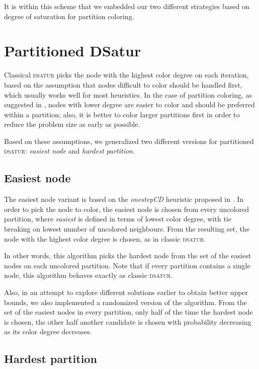 It is within this scheme that we embedded our two different strategies based on degree of saturation for partition coloring.

\section{Partitioned DSatur}
\label{subsec:heur:pdsatur}

Classical \textsc{dsatur} picks the node with the highest color degree on each iteration, based on the assumption that nodes difficult to color should be handled first, which usually works well for most heuristics. In the case of partition coloring, as suggested in \cite{Li00thepartition}, nodes with lower degree are easier to color and should be preferred within a partition; also, it is better to color larger partitions first in order to reduce the problem size as early as possible.

Based on these assumptions, we generalized two different versions for partitioned \textsc{dsatur}: \textit{easiest node} and \textit{hardest partition}.

\subsection{Easiest node}

The easiest node variant is based on the \textit{onestepCD} heuristic proposed in \cite{Li00thepartition}. In order to pick the node to color, the easiest node is chosen from every uncolored partition, where \textit{easiest} is defined in terms of lowest color degree, with tie breaking on lowest number of uncolored neighbours. From the resulting set, the node with the highest color degree is chosen, as in classic \textsc{dsatur}. 

In other words, this algorithm picks the hardest node from the set of the easiest nodes on each uncolored partition. Note that if every partition contains a single node, this algorithm behaves exactly as classic \textsc{dsatur}.

Also, in an attempt to explore different solutions earlier to obtain better upper bounds, we also implemented a randomized version of the algorithm. From the set of the easiest nodes in every partition, only half of the time the hardest node is chosen, the other half another candidate is chosen with probability decreasing as its color degree decreases.

\subsection{Hardest partition}

